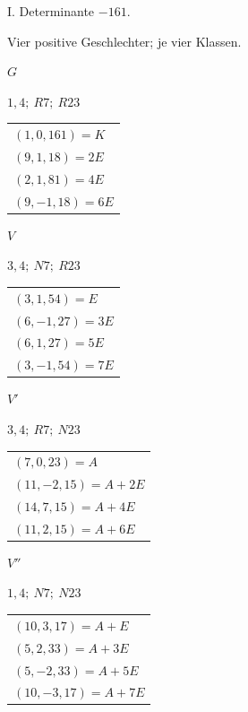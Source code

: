\begin{center}I. Determinante \(-161\).\par\smallskip Vier positive Geschlechter; je vier Klassen.\end{center}
\begin{center}
\begin{minipage}[t]{0.47\linewidth}\centering
\(G\)\par\smallskip
{\small \(1,4;\ R7;\ R23\)}\par\smallskip
\begin{tabular}{@{}l@{}}
\((1,0,161)=K\)\\\((9,1,18)=2E\)\\\((2,1,81)=4E\)\\\((9,-1,18)=6E\)
\end{tabular}
\end{minipage}\hfill\begin{minipage}[t]{0.47\linewidth}\centering
\(V\)\par\smallskip
{\small \(3,4;\ N7;\ R23\)}\par\smallskip
\begin{tabular}{@{}l@{}}
\((3,1,54)=E\)\\\((6,-1,27)=3E\)\\\((6,1,27)=5E\)\\\((3,-1,54)=7E\)
\end{tabular}
\end{minipage}
\end{center}
\begin{center}
\begin{minipage}[t]{0.47\linewidth}\centering
\(V'\)\par\smallskip
{\small \(3,4;\ R7;\ N23\)}\par\smallskip
\begin{tabular}{@{}l@{}}
\((7,0,23)=A\)\\\((11,-2,15)=A+2E\)\\\((14,7,15)=A+4E\)\\\((11,2,15)=A+6E\)
\end{tabular}
\end{minipage}\hfill\begin{minipage}[t]{0.47\linewidth}\centering
\(V''\)\par\smallskip
{\small \(1,4;\ N7;\ N23\)}\par\smallskip
\begin{tabular}{@{}l@{}}
\((10,3,17)=A+E\)\\\((5,2,33)=A+3E\)\\\((5,-2,33)=A+5E\)\\\((10,-3,17)=A+7E\)
\end{tabular}
\end{minipage}
\end{center}
